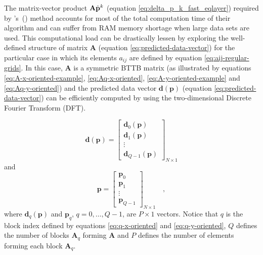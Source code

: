 \documentclass[manuscript,revised]{geophysics}
\begin{document}
The matrix-vector product $\tensor{A} \hat{\mathbf{p}}^{k}$ (equation \ref{eq:delta_p_k_fast_eqlayer}) 
required by \citeauthor{siqueira-etal2017}'s~(\citeyear{siqueira-etal2017}) method
accounts for most of the total computation time of their algorithm and can suffer
from RAM memory shortage when large data sets are used.
This computational load can be drastically lessen by exploring the well-defined structure of 
matrix $\mathbf{A}$ (equation \ref{eq:predicted-data-vector}) for the particular case in which 
its elements $a_{ij}$ are defined by equation \ref{eq:aij-regular-grids}. 
In this case, $\mathbf{A}$ is a symmetric BTTB matrix (as illustrated by equations
\ref{eq:A-x-oriented-example}, \ref{eq:Aq-x-oriented}, \ref{eq:A-y-oriented-example} and
\ref{eq:Aq-y-oriented}) and the predicted data vector 
$\mathbf{d}(\mathbf{p})$ (equation \ref{eq:predicted-data-vector}) can be efficiently
computed by using the two-dimensional Discrete Fourier Transform (DFT).

\begin{equation}
\mathbf{d}(\mathbf{p}) = \begin{bmatrix}
\mathbf{d}_{0}(\mathbf{p}) \\
\mathbf{d}_{1}(\mathbf{p}) \\
\vdots \\
\mathbf{d}_{Q - 1}(\mathbf{p})
\end{bmatrix}_{N \times 1}
\label{eq:predicted-data-vector-partitioned}
\end{equation}
and
\begin{equation}
\mathbf{p} = \begin{bmatrix}
\mathbf{p}_{0} \\
\mathbf{p}_{1} \\
\vdots \\
\mathbf{p}_{Q - 1}
\end{bmatrix}_{N \times 1} \quad ,
\label{eq:parameter-vector-partitioned}
\end{equation}
where $\mathbf{d}_{q}(\mathbf{p})$ and $\mathbf{p}_{q}$, $q = 0, \dots, Q - 1$,
are $P \times 1$ vectors. Notice that $q$ is the block index defined by equations 
\ref{eq:q-x-oriented} and \ref{eq:q-y-oriented}, $Q$ defines the number of blocks
$\mathbf{A}_{q}$ forming $\mathbf{A}$ and $P$ defines the number of elements forming 
each block $\mathbf{A}_{q}$.
\end{document}
